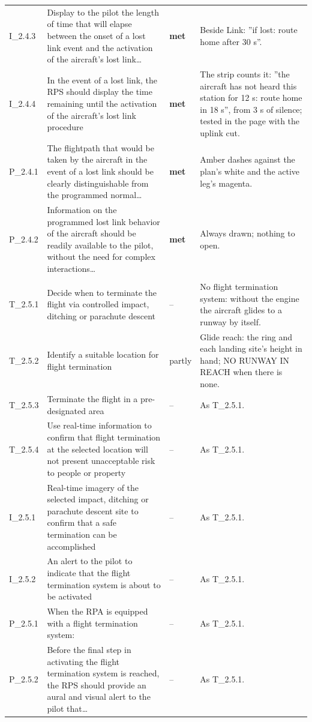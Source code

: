 \begin{longtable}{@{}>{\raggedright\arraybackslash}p{12mm}>{\raggedright\arraybackslash}p{57mm}>{\raggedright\arraybackslash}p{13mm}>{\raggedright\arraybackslash}p{70mm}@{}}
I\_2.4.3 & Display to the pilot the length of time that will elapse between the onset of a lost link event and the activation of the aircraft’s lost link\ldots{} & \textbf{met} & Beside Link: ''if lost: route home after 30 s''. \\
I\_2.4.4 & In the event of a lost link, the RPS should display the time remaining until the activation of the aircraft’s lost link procedure & \textbf{met} & The strip counts it: ''the aircraft has not heard this station for 12 s: route home in 18 s'', from 3 s of silence; tested in the page with the uplink cut. \\
P\_2.4.1 & The flightpath that would be taken by the aircraft in the event of a lost link should be clearly distinguishable from the programmed normal\ldots{} & \textbf{met} & Amber dashes against the plan's white and the active leg's magenta. \\
P\_2.4.2 & Information on the programmed lost link behavior of the aircraft should be readily available to the pilot, without the need for complex interactions\ldots{} & \textbf{met} & Always drawn; nothing to open. \\
\addlinespace\multicolumn{4}{@{}l}{\textbf{Ending the flight}} \\
T\_2.5.1 & Decide when to terminate the flight via controlled impact, ditching or parachute descent & -- & No flight termination system: without the engine the aircraft glides to a runway by itself. \\
T\_2.5.2 & Identify a suitable location for flight termination & partly & Glide reach: the ring and each landing site's height in hand; NO RUNWAY IN REACH when there is none. \\
T\_2.5.3 & Terminate the flight in a pre-designated area & -- & As T\_2.5.1. \\
T\_2.5.4 & Use real-time information to confirm that flight termination at the selected location will not present unacceptable risk to people or property & -- & As T\_2.5.1. \\
I\_2.5.1 & Real-time imagery of the selected impact, ditching or parachute descent site to confirm that a safe termination can be accomplished & -- & As T\_2.5.1. \\
I\_2.5.2 & An alert to the pilot to indicate that the flight termination system is about to be activated & -- & As T\_2.5.1. \\
P\_2.5.1 & When the RPA is equipped with a flight termination system: & -- & As T\_2.5.1. \\
P\_2.5.2 & Before the final step in activating the flight termination system is reached, the RPS should provide an aural and visual alert to the pilot that\ldots{} & -- & As T\_2.5.1. \\

\end{longtable}
